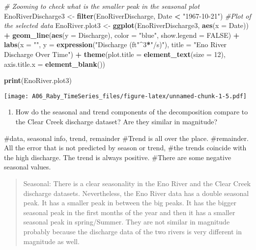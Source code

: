 \documentclass[]{article}
\newenvironment{Shaded}{\begin{snugshade}}{\end{snugshade}}
\newcommand{\CommentTok}[1]{\textcolor[rgb]{0.56,0.35,0.01}{\textit{#1}}}
\newcommand{\DataTypeTok}[1]{\textcolor[rgb]{0.13,0.29,0.53}{#1}}
\newcommand{\DecValTok}[1]{\textcolor[rgb]{0.00,0.00,0.81}{#1}}
\newcommand{\KeywordTok}[1]{\textcolor[rgb]{0.13,0.29,0.53}{\textbf{#1}}}
\newcommand{\NormalTok}[1]{#1}
\newcommand{\OperatorTok}[1]{\textcolor[rgb]{0.81,0.36,0.00}{\textbf{#1}}}
\newcommand{\OtherTok}[1]{\textcolor[rgb]{0.56,0.35,0.01}{#1}}
\newcommand{\StringTok}[1]{\textcolor[rgb]{0.31,0.60,0.02}{#1}}
\providecommand{\tightlist}{%
  \setlength{\itemsep}{0pt}\setlength{\parskip}{0pt}}
\begin{document}
\begin{Shaded}
\begin{Highlighting}[]
\CommentTok{# Zooming to check what is the smaller peak in the seasonal plot}
\NormalTok{EnoRiverDischarge3 <-}\StringTok{ }\KeywordTok{filter}\NormalTok{(EnoRiverDischarge, Date }\OperatorTok{<}\StringTok{ "1967-10-21"}\NormalTok{)}
\CommentTok{#Plot of the selected data}
\NormalTok{EnoRiver.plot3 <-}\StringTok{ }\KeywordTok{ggplot}\NormalTok{(EnoRiverDischarge3, }\KeywordTok{aes}\NormalTok{(}\DataTypeTok{x =}\NormalTok{ Date)) }\OperatorTok{+}
\StringTok{  }\KeywordTok{geom_line}\NormalTok{(}\KeywordTok{aes}\NormalTok{(}\DataTypeTok{y =}\NormalTok{ Discharge), }\DataTypeTok{color =} \StringTok{"blue"}\NormalTok{, }\DataTypeTok{show.legend =} \OtherTok{FALSE}\NormalTok{) }\OperatorTok{+}
\StringTok{  }\KeywordTok{labs}\NormalTok{(}\DataTypeTok{x =} \StringTok{""}\NormalTok{, }\DataTypeTok{y =} \KeywordTok{expression}\NormalTok{(}\StringTok{"Discharge (ft"}\OperatorTok{^}\DecValTok{3}\OperatorTok{*}\StringTok{"/s)"}\NormalTok{), }
       \DataTypeTok{title =} \StringTok{"Eno River Discharge Over Time"}\NormalTok{) }\OperatorTok{+}
\StringTok{  }\KeywordTok{theme}\NormalTok{(}\DataTypeTok{plot.title =} \KeywordTok{element_text}\NormalTok{(}\DataTypeTok{size =} \DecValTok{12}\NormalTok{),}
        \DataTypeTok{axis.title.x =} \KeywordTok{element_blank}\NormalTok{())}

\KeywordTok{print}\NormalTok{(EnoRiver.plot3)}
\end{Highlighting}
\end{Shaded}

\texttt{[image: A06\_Raby\_TimeSeries\_files/figure-latex/unnamed-chunk-1-5.pdf]}

\begin{enumerate}
\def\labelenumi{\arabic{enumi}.}
\setcounter{enumi}{9}
\tightlist
\item
  How do the seasonal and trend components of the decomposition compare
  to the Clear Creek discharge dataset? Are they similar in magnitude?
\end{enumerate}

\#data, seasonal info, trend, remainder \#Trend is all over the place.
\#remainder. All the error that is not predicted by season or trend,
\#the trends coincide with the high discharge. The trend is always
positive. \#There are some negative seasonal values.

\begin{quote}
Seasonal: There is a clear seasonality in the Eno River and the Clear
Creek discharge datasets. Nevertheless, the Eno River data has a double
seasonal peak. It has a smaller peak in between the big peaks. It has
the bigger seasonal peak in the first months of the year and then it has
a smaller seasonal peak in spring/Summer. They are not similar in
magnitude probably because the discharge data of the two rivers is very
different in magnitude as well.
\end{quote}
\end{document}
